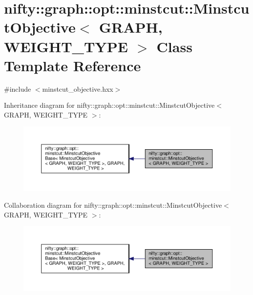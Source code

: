 \hypertarget{classnifty_1_1graph_1_1opt_1_1minstcut_1_1MinstcutObjective}{}\section{nifty\+:\+:graph\+:\+:opt\+:\+:minstcut\+:\+:Minstcut\+Objective$<$ G\+R\+A\+PH, W\+E\+I\+G\+H\+T\+\_\+\+T\+Y\+PE $>$ Class Template Reference}
\label{classnifty_1_1graph_1_1opt_1_1minstcut_1_1MinstcutObjective}


{\ttfamily \#include $<$minstcut\+\_\+objective.\+hxx$>$}



Inheritance diagram for nifty\+:\+:graph\+:\+:opt\+:\+:minstcut\+:\+:Minstcut\+Objective$<$ G\+R\+A\+PH, W\+E\+I\+G\+H\+T\+\_\+\+T\+Y\+PE $>$\+:
\nopagebreak
\begin{figure}[H]
\begin{center}
\leavevmode
\includegraphics[width=350pt]{classnifty_1_1graph_1_1opt_1_1minstcut_1_1MinstcutObjective__inherit__graph}
\end{center}
\end{figure}


Collaboration diagram for nifty\+:\+:graph\+:\+:opt\+:\+:minstcut\+:\+:Minstcut\+Objective$<$ G\+R\+A\+PH, W\+E\+I\+G\+H\+T\+\_\+\+T\+Y\+PE $>$\+:
\nopagebreak
\begin{figure}[H]
\begin{center}
\leavevmode
\includegraphics[width=350pt]{classnifty_1_1graph_1_1opt_1_1minstcut_1_1MinstcutObjective__coll__graph}
\end{center}
\end{figure}
